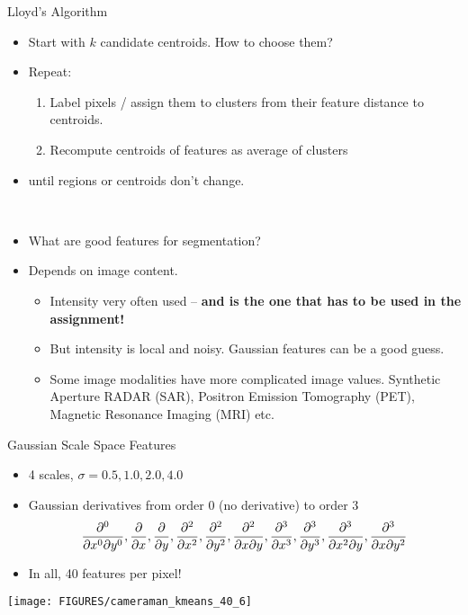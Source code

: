 \documentclass[9pt]{beamer}
\begin{document}
\begin{frame}[t]{Lloyd's Algorithm}
  \begin{itemize}
  \item Start with $k$ candidate centroids. How to choose them?
  \item Repeat:
    \begin{enumerate}
    \item Label pixels / assign them to clusters from their feature distance to centroids.
    \item Recompute centroids of features as average of clusters
    \end{enumerate}
  \item until regions or centroids don't change.
  \end{itemize}
  ~\\
  \begin{itemize}
  \item What are good features for segmentation?
  \item Depends on image content.
    \begin{itemize}
    \item Intensity very often used -- \textbf{and is the one that has to be used in the assignment!}
    \item But intensity is local and noisy. Gaussian features can be a good guess.
    \item Some image modalities have more complicated image values. Synthetic Aperture
      RADAR (SAR), Positron Emission Tomography (PET), Magnetic Resonance Imaging (MRI) etc.
    \end{itemize}
  \end{itemize}
\end{frame}


\begin{frame}[t]{Gaussian Scale Space Features}
  \begin{itemize}
  \item 4 scales, $\sigma = 0.5, 1.0, 2.0, 4.0$
  \item Gaussian derivatives from order 0 (no derivative) to order 3
    $$
    \frac{\partial^{0}{}}{\partial{x^0\partial
      y^0}},\frac{\partial{}}{\partial{x}},\frac{\partial{}}{\partial{y}},\frac{\partial^{2}{}}{\partial{x^2}},\frac{\partial^{2}{}}{\partial{y^2}},\frac{\partial^{2}{}}{\partial{x\partial
      y}},\frac{\partial^{3}{}}{\partial{x^3}},\frac{\partial^{3}{}}{\partial{y^3}},\frac{\partial^{3}{}}{\partial{x^2\partial
      y}},\frac{\partial^{3}{}}{\partial{x\partial y^2}}
    $$
  \item In all, 40 features per pixel!
  \end{itemize}
  
  \begin{center}
    \texttt{[image: FIGURES/cameraman\_kmeans\_40\_6]}
  \end{center}
 
  
\end{frame}
\end{document}
